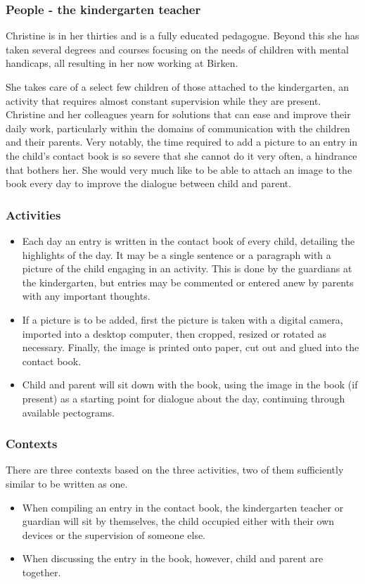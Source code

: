\subsubsection{People - the kindergarten teacher}
Christine is in her thirties and is a fully educated pedagogue. Beyond this she has taken several degrees and courses focusing on the needs of children with mental handicaps, all resulting in her now working at Birken.

She takes care of a select few children of those attached to the kindergarten, an activity that requires almost constant supervision while they are present. Christine and her colleagues yearn for solutions that can ease and improve their daily work, particularly within the domains of communication with the children and their parents. Very notably, the time required to add a picture to an entry in the child's contact book is so severe that she cannot do it very often, a hindrance that bothers her. She would very much like to be able to attach an image to the book every day to improve the dialogue between child and parent.

\subsubsection{Activities}
\begin{itemize}
	\item Each day an entry is written in the contact book of every child, detailing the highlights of the day. It may be a single sentence or a paragraph with a picture of the child engaging in an activity. This is done by the guardians at the kindergarten, but entries may be commented or entered anew by parents with any important thoughts.
	\item If a picture is to be added, first the picture is taken with a digital camera, imported into a desktop computer, then cropped, resized or rotated as necessary. Finally, the image is printed onto paper, cut out and glued into the contact book.
	\item Child and parent will sit down with the book, using the image in the book (if present) as a starting point for dialogue about the day, continuing through available pectograms.
\end{itemize}

\subsubsection{Contexts}
There are three contexts based on the three activities, two of them sufficiently similar to be written as one.
\begin{itemize}
	\item When compiling an entry in the contact book, the kindergarten teacher or guardian will sit by themselves, the child occupied either with their own devices or the supervision of someone else. 
	\item When discussing the entry in the book, however, child and parent are together.
\end{itemize}

